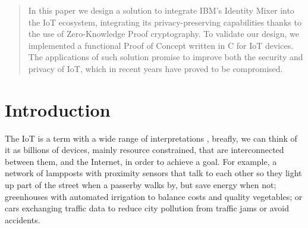 \documentclass[journal]{IEEEtran}
\begin{document}







\maketitle

\begin{abstract}
In this paper we design a solution to integrate IBM's Identity Mixer into the IoT ecosystem, integrating its privacy-preserving capabilities thanks to the use of Zero-Knowledge Proof cryptography. To validate our design, we implemented a functional Proof of Concept written in C for IoT devices. The applications of such solution promise to improve both the security and privacy of IoT, which in recent years have proved to be compromised.
\end{abstract}







%
\IEEEpeerreviewmaketitle



\section{Introduction}

The IoT is a term with a wide range of interpretations \cite{Atzori20102787}, breafly, we can think of it as billions of devices, mainly resource constrained, that are interconnected between them, and the Internet, in order to achieve a goal. For example, a network of lampposts with proximity sensors that talk to each other so they light up part of the street when a passerby walks by, but save energy when not; greenhouses with automated irrigation to balance costs and quality vegetables; or cars exchanging traffic data to reduce city pollution from traffic jams or avoid accidents.
\end{document}
